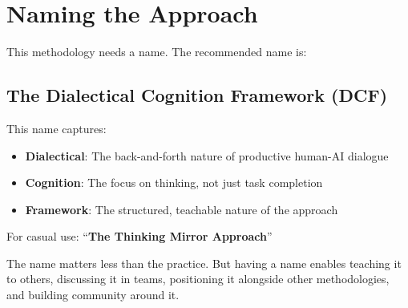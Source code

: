 \chapter{Naming the Approach}

This methodology needs a name. The recommended name is:

\section{The Dialectical Cognition Framework (DCF)}

This name captures:

\begin{itemize}
    \item \textbf{Dialectical}: The back-and-forth nature of productive human-AI dialogue
    \item \textbf{Cognition}: The focus on thinking, not just task completion
    \item \textbf{Framework}: The structured, teachable nature of the approach
\end{itemize}

For casual use: ``\textbf{The Thinking Mirror Approach}''

The name matters less than the practice. But having a name enables teaching it to others, discussing it in teams, positioning it alongside other methodologies, and building community around it.


